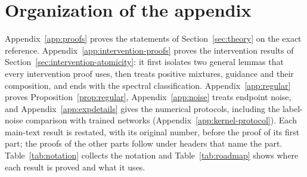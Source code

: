 \documentclass{article} %
\theoremstyle{plain}
\theoremstyle{definition}
\theoremstyle{remark}
\begin{document}
\section*{Organization of the appendix}

Appendix~\ref{app:proofs} proves the statements of Section~\ref{sec:theory} on the exact
reference. Appendix~\ref{app:intervention-proofs} proves the intervention results of
Section~\ref{sec:intervention-atomicity}: it first isolates two general lemmas that every
intervention proof uses, then treats positive mixtures, guidance and their composition, and ends
with the spectral classification. Appendix~\ref{app:regular} proves
Proposition~\ref{prop:regular}, Appendix~\ref{app:noise} treats endpoint noise, and
Appendix~\ref{app:expdetails} gives the numerical protocols, including the label-noise
comparison with trained networks (Appendix~\ref{app:kernel-protocol}). Each main-text result is restated,
with its original number, before the proof of its first part; the proofs of the other parts follow
under headers that name the part. Table~\ref{tab:notation} collects the
notation and Table~\ref{tab:roadmap} shows where each result is proved and what it uses.
\end{document}
